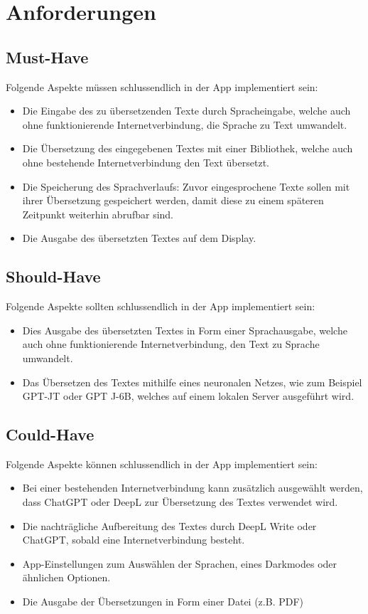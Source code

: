 \newpage
\section{Anforderungen}\label{sec:requirements}

\subsection{Must-Have}
Folgende Aspekte müssen schlussendlich in der App implementiert sein:
\begin{itemize}
    \item Die Eingabe des zu übersetzenden Texte durch Spracheingabe, welche auch ohne funktionierende Internetverbindung, die Sprache zu Text umwandelt.
    \item Die Übersetzung des eingegebenen Textes mit einer Bibliothek, welche auch ohne bestehende Internetverbindung den Text übersetzt.
    \item     Die Speicherung des Sprachverlaufs: Zuvor eingesprochene Texte sollen mit
ihrer Übersetzung gespeichert werden, damit diese zu einem späteren
Zeitpunkt weiterhin abrufbar sind.
    \item Die Ausgabe des übersetzten Textes auf dem Display.
\end{itemize}

\subsection{Should-Have}
Folgende Aspekte sollten schlussendlich in der App implementiert sein:
\begin{itemize}
    \item Dies Ausgabe des übersetzten Textes in Form einer Sprachausgabe, welche auch ohne funktionierende Internetverbindung, den Text zu Sprache umwandelt.
    \item Das Übersetzen des Textes mithilfe eines neuronalen Netzes, wie zum Beispiel
GPT-JT oder GPT J-6B, welches auf einem lokalen Server ausgeführt wird.
\end{itemize}

\subsection{Could-Have}
Folgende Aspekte können schlussendlich in der App implementiert sein:
\begin{itemize}
    \item Bei einer bestehenden Internetverbindung kann zusätzlich ausgewählt werden, dass ChatGPT oder DeepL zur Übersetzung des Textes verwendet wird.
\item Die nachträgliche Aufbereitung des Textes durch DeepL Write oder ChatGPT, sobald eine Internetverbindung besteht.
\item App-Einstellungen zum Auswählen der Sprachen, eines Darkmodes oder ähnlichen Optionen.
\item Die Ausgabe der Übersetzungen in Form einer Datei (z.B. PDF)
\end{itemize}